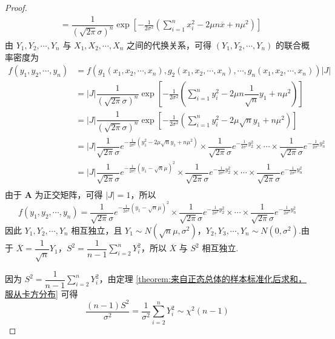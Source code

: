 \begin{proof}
$$\begin{aligned}
        &= \dfrac{1}{(\sqrt{2 \pi} \sigma)^n} \exp{ \left[-\frac{1}{2 \sigma^2} \left( \sum_{i=1}^{n} x_i^2 - 2 \mu n \overline{x} + n \mu^2 \right) \right] }
    \end{aligned}
    $$
    由 $Y_1, Y_2, \cdots, Y_n$ 与 $X_1,X_2,\cdots,X_n$ 之间的代换关系，可得 $(Y_1, Y_2, \cdots, Y_n)$ 的联合概率密度为
    $$
    \begin{aligned}
        f(y_1, y_2, \cdots, y_n) &= f(g_1(x_1, x_2, \cdots, x_n), g_2(x_1, x_2, \cdots, x_n), \cdots, g_n(x_1, x_2, \cdots, x_n)) |J| \\
        &= |J| \dfrac{1}{(\sqrt{2 \pi} \sigma)^n} \exp{ \left[-\frac{1}{2 \sigma^2} \left( \sum_{i=1}^{n} y_i^2 - 2 \mu n \dfrac{1}{\sqrt{n}} y_1 + n \mu^2 \right) \right] } \\
        &= |J| \dfrac{1}{(\sqrt{2 \pi} \sigma)^n} \exp{ \left[-\frac{1}{2 \sigma^2} \left( \sum_{i=1}^{n} y_i^2 - 2 \mu \sqrt{n} y_1 + n \mu^2 \right) \right] } \\
        &= |J| \dfrac{1}{\sqrt{2 \pi} \sigma} e^{-\frac{1}{2 \sigma^2} (y_1^2 - 2 \mu \sqrt{n} y_1 + n \mu^2)} \times \dfrac{1}{\sqrt{2 \pi} \sigma} e^{-\frac{1}{2 \sigma^2} y_2^2} \times \cdots \times \dfrac{1}{\sqrt{2 \pi} \sigma} e^{-\frac{1}{2 \sigma^2} y_n^2} \\
        &= |J| \dfrac{1}{\sqrt{2 \pi} \sigma} e^{-\frac{1}{2 \sigma^2} (y_1 - \sqrt{n} \mu)^2} \times \dfrac{1}{\sqrt{2 \pi} \sigma} e^{-\frac{1}{2 \sigma^2} y_2^2} \times \cdots \times \dfrac{1}{\sqrt{2 \pi} \sigma} e^{-\frac{1}{2 \sigma^2} y_n^2} \\
    \end{aligned}
    $$
    由于 $\boldsymbol{A}$ 为正交矩阵，可得 $|J|=1$，所以
    $$
    f(y_1, y_2, \cdots, y_n) = \dfrac{1}{\sqrt{2 \pi} \sigma} e^{-\frac{1}{2 \sigma^2} (y_1 - \sqrt{n} \mu)^2} \times \dfrac{1}{\sqrt{2 \pi} \sigma} e^{-\frac{1}{2 \sigma^2} y_2^2} \times \cdots \times \dfrac{1}{\sqrt{2 \pi} \sigma} e^{-\frac{1}{2 \sigma^2} y_n^2}
    $$
    因此 $Y_1, Y_2, \cdots, Y_n$ 相互独立，且 $Y_1 \sim N(\sqrt{n} \mu, \sigma^2)$，$Y_2, Y_3, \cdots, Y_n \sim N(0, \sigma^2)$.由于 $\overline{X} = \dfrac{1}{\sqrt{n}} Y_1$，$S^2 = \dfrac{1}{n-1} \displaystyle\sum_{i=2}^n Y_i^2$，所以 $\overline{X}$ 与 $S^2$ 相互独立.

    因为 $S^2 = \dfrac{1}{n-1} \displaystyle\sum_{i=2}^n Y_i^2$，由定理 \ref{theorem:来自正态总体的样本标准化后求和，服从卡方分布} 可得
    $$
    \dfrac{(n-1) S^2}{\sigma^2} = \dfrac{1}{\sigma^2} \sum_{i=2}^n Y_i^2 \sim \chi^2(n-1)
    $$
\end{proof}

